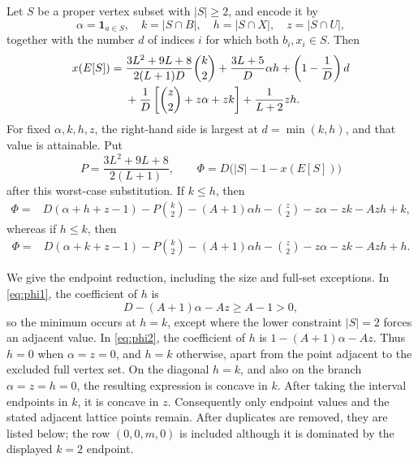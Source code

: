 \documentclass[11pt]{article}
\begin{document}
Let $S$ be a proper vertex subset with $|S|\geq2$, and encode it by
\[
 \alpha=\boldsymbol 1_{a\in S},\quad k=|S\cap B|,\quad
 h=|S\cap X|,\quad z=|S\cap U|,
\]
together with the number $d$ of indices $i$ for which both $b_i,x_i\in S$.
Then
\begin{align}
x(E[S])={}&\frac{3L^2+9L+8}{2(L+1)D}\binom{k}{2}
 +\frac{3L+5}{D}\alpha h+\left(1-\frac1D\right)d \notag\\
&+\frac1D\left[\binom{z}{2}+z\alpha+zk\right]
 +\frac1{L+2}zh.                                      \label{eq:internal}
\end{align}
For fixed $\alpha,k,h,z$, the right-hand side is largest at
$d=\min(k,h)$, and that value is attainable.  Put
\[
 P=\frac{3L^2+9L+8}{2(L+1)},\qquad
 \Phi=D\bigl(|S|-1-x(E[S])\bigr)
\]
after this worst-case substitution.  If $k\leq h$, then
\begin{align}
\Phi={}&D(\alpha+h+z-1)-P\binom{k}{2}-(A+1)\alpha h
-\binom{z}{2}-z\alpha-zk-Azh+k,                    \label{eq:phi1}
\end{align}
whereas if $h\leq k$, then
\begin{align}
\Phi={}&D(\alpha+k+z-1)-P\binom{k}{2}-(A+1)\alpha h
-\binom{z}{2}-z\alpha-zk-Azh+h.                    \label{eq:phi2}
\end{align}

We give the endpoint reduction, including the size and full-set exceptions.
In \eqref{eq:phi1}, the coefficient of $h$ is
\[
 D-(A+1)\alpha-Az\geq A-1>0,
\]
so the minimum occurs at $h=k$, except where the lower constraint $|S|=2$
forces an adjacent value.  In \eqref{eq:phi2}, the coefficient of $h$ is
$1-(A+1)\alpha-Az$.  Thus $h=0$ when $\alpha=z=0$, and $h=k$ otherwise,
apart from the point adjacent to the excluded full vertex set.  On the
diagonal $h=k$, and also on the branch $\alpha=z=h=0$, the resulting
expression is concave in $k$.  After taking the interval endpoints in $k$,
it is concave in $z$.  Consequently only endpoint values and the stated
adjacent lattice points remain.  After duplicates are removed, they are
listed below; the row $(0,0,m,0)$ is included although it is dominated by
the displayed $k=2$ endpoint.
\end{document}
